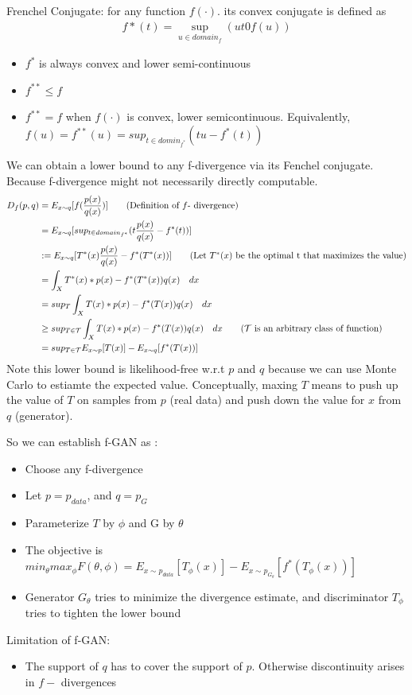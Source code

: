Frenchel Conjugate: for any function $f(\cdot)$. its convex conjugate is defined as 
    \begin{align*}
        f*(t) = \sup_{u\in domain_f}(ut 0 f(u))
    \end{align*}
    \begin{itemize}
        \item $f^*$ is always convex and lower semi-continuous 
        \item $f^{**} \leq f$
        \item $f^{**} = f$ when $f(\cdot)$ is convex, lower semicontinuous. Equivalently, $f(u) = f^{**}(u) = sup_{t\in domin_{f^*}} (tu - f^*(t))$
    \end{itemize}
We can obtain a lower bound to any f-divergence via its Fenchel conjugate. Because f-divergence might not necessarily directly computable. 
    \begin{align*}
        D_f(p,q) 
        & = E_{x\sim q}[f(\frac{p(x)}{q(x)})] \tag{Definition of $f$- divergence}\\
        & = E_{x\sim q}[sup_{t\in domain_{f^*}} (t \frac{p(x)}{q(x)} - f^*(t))]\\
        & := E_{x\sim q}[T^*(x) \frac{p(x)}{q(x)} - f^*(T^*(x))] \tag{Let $T^*(x)$ be the optimal t that maximizes the value} \\
        & = \int_X T^*(x) * p(x) - f^*(T^*(x)) q(x) \quad dx \\
        & = sup_T \int_X T(x) * p(x) - f^*(T(x)) q(x) \quad dx \\
        & \geq sup_{T \in \mathcal{T}} \int_X T(x) * p(x) - f^*(T(x)) q(x) \quad dx  \tag{$\mathcal{T}$ is an arbitrary class of function} \\
        & = sup_{T \in \mathcal{T}} E_{x\sim p}[T(x)] - E_{x\sim q}[f^*(T(x))] 
    \end{align*}
Note this lower bound is likelihood-free w.r.t $p$ and $q$ because we can use Monte Carlo to estiamte the expected value. Conceptually, maxing $T$ means to push up the value of $T$ on samples from $p$ (real data) and push down the value for $x$ from $q$ (generator). 


So we can establish f-GAN as :
    \begin{itemize}
        \item Choose any f-divergence 
        \item Let $p = p_{data}$, and $q = p_G$
        \item Parameterize $T$ by $\phi$ and G by $\theta$
        \item The objective is $min_\theta max_\phi F(\theta, \phi) = E_{x\sim p_{data}}[T_\phi(x)] - E_{x\sim p_{G_\theta}}[f^*(T_\phi(x))]$
        \item Generator $G_\theta$ tries to minimize the divergence estimate, and discriminator $T_\phi$ tries to tighten the lower bound
    \end{itemize}
Limitation of f-GAN: 
    \begin{itemize}
        \item The support of $q$ has to cover the support of $p$. Otherwise discontinuity arises in $f-$ divergences
    \end{itemize}


